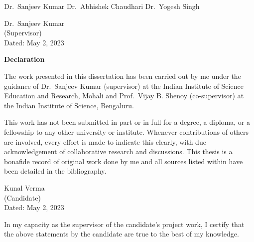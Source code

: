 \documentclass[a4paper,12pt]{report}
\numberwithin{equation}{section}
\begin{document}
Dr.~Sanjeev Kumar \hspace{1.5cm} Dr.~Abhishek Chaudhari \hspace{1.5cm}  Dr.~Yogesh Singh

\vspace{4cm}

\begin{flushright}
    Dr.~Sanjeev Kumar
    \\
    (Supervisor)
    \\
    \vspace{4cm}
    Dated: May 2, 2023
\end{flushright}

\cleardoublepage
\newpage
\thispagestyle{empty}
\mbox{}
\newpage

\begin{center}
    \textsf{\textbf{\Large Declaration}} 
\end{center}
\vspace*{1em}

The work presented in this dissertation has been carried out by me under the guidance of Dr.~Sanjeev Kumar (supervisor) at the Indian Institute of Science Education and Research, Mohali and Prof.~Vijay B. Shenoy (co-supervisor) at the Indian Institute of Science, Bengaluru.

\vspace{0.4cm}

This work has not been submitted in part or in full for a degree, a diploma, or a fellowship to any other university or institute. Whenever contributions of others are involved, every effort is made to indicate this clearly, with due acknowledgement of collaborative research and discussions. This thesis is a bonafide record of original work done by me and all sources listed within have been detailed in the bibliography.

\vspace{2cm}

\begin{flushright}
Kunal Verma
\\
(Candidate)
\\
Dated: May 2, 2023
\end{flushright}
\vspace*{1em}

In my capacity as the supervisor of the candidate's project work, I certify that the above statements by the candidate are true to the best of my knowledge.

\vspace{2cm}
\end{document}
